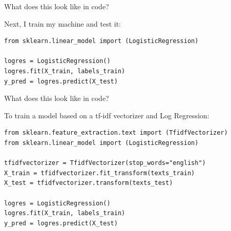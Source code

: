 \documentclass[handout]{beamer}
\begin{document}
\begin{frame}[fragile]{What does this look like in code?}
	
Next, I train my machine and test it: 
	
\begin{lstlisting}
from sklearn.linear_model import (LogisticRegression)

logres = LogisticRegression()
logres.fit(X_train, labels_train)
y_pred = logres.predict(X_test)
\end{lstlisting}
	
\end{frame}


\begin{frame}[fragile]{What does this look like in code?}
	
To train a model based on a tf-idf vectorizer and Log Regression:
	
\begin{lstlisting}
from sklearn.feature_extraction.text import (TfidfVectorizer)
from sklearn.linear_model import (LogisticRegression)

tfidfvectorizer = TfidfVectorizer(stop_words="english")
X_train = tfidfvectorizer.fit_transform(texts_train)
X_test = tfidfvectorizer.transform(texts_test)

logres = LogisticRegression()
logres.fit(X_train, labels_train)
y_pred = logres.predict(X_test)
\end{lstlisting}
	
\end{frame}
\end{document}

